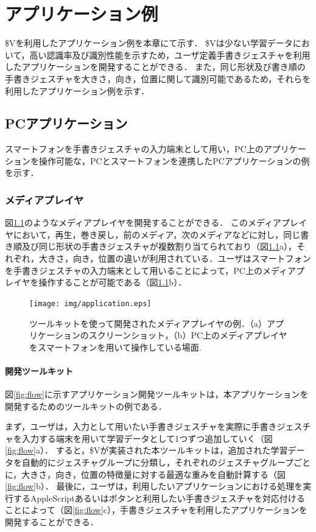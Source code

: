 \chapter{アプリケーション例}
\$Vを利用したアプリケーション例を本章にて示す．
\$Vは少ない学習データにおいて，高い認識率及び識別性能を示すため，ユーザ定義手書きジェスチャを利用したアプリケーションを開発することができる．
また，同じ形状及び書き順の手書きジェスチャを大きさ，向き，位置に関して識別可能であるため，それらを利用したアプリケーション例を示す．

\section{PCアプリケーション}
スマートフォンを手書きジェスチャの入力端末として用い，PC上のアプリケーションを操作可能な，PCとスマートフォンを連携したPCアプリケーションの例を示す．
\subsection{メディアプレイヤ}
図\ref{fig:application}のようなメディアプレイヤを開発することができる．
このメディアプレイヤにおいて，再生，巻き戻し，前のメディア，次のメディアなどに対し，同じ書き順及び同じ形状の手書きジェスチャが複数割り当てられており（図\ref{fig:application}a），それぞれ，大きさ，向き，位置の違いが利用されている．ユーザはスマートフォンを手書きジェスチャの入力端末として用いることによって，PC上のメディアプレイヤを操作することが可能である（図\ref{fig:application}b）．

\begin{figure} [h!]
	\begin{center}
		\texttt{[image: img/application.eps]}
	\end{center}
	\caption{ツールキットを使って開発されたメディアプレイヤの例．（a）アプリケーションのスクリーンショット，（b）PC上のメディアプレイヤをスマートフォンを用いて操作している場面.}
	\label{fig:application}
\end{figure}

\subsubsection{開発ツールキット}
図\ref{fig:flow}に示すアプリケーション開発ツールキットは，本アプリケーションを開発するためのツールキットの例である．

まず，ユーザは，入力として用いたい手書きジェスチャを実際に手書きジェスチャを入力する端末を用いて学習データとして1つずつ追加していく（図\ref{fig:flow}a）．
すると，\$Vが実装された本ツールキットは，追加された学習データを自動的にジェスチャグループに分類し，それぞれのジェスチャグループごとに，大きさ，向き，位置の特徴量に対する最適な重みを自動計算する（図\ref{fig:flow}b）．
最後に，ユーザは，利用したいアプリケーションにおける処理を実行するAppleScriptあるいはボタンと利用したい手書きジェスチャを対応付けることによって（図\ref{fig:flow}c），手書きジェスチャを利用したアプリケーションを開発することができる．

